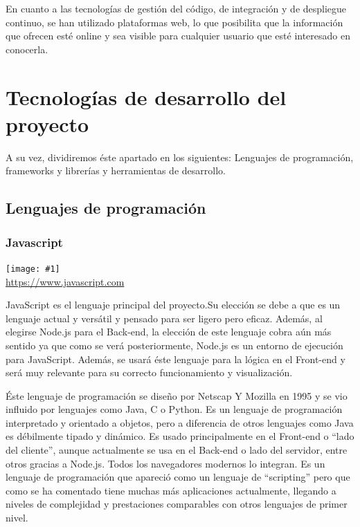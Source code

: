 \documentclass[11pt,openany]{book}
\newcommand{\logo}[2]{\medskip\begin{center}\texttt{[image: \#1]}\\\scriptsize\url{#2}\end{center}\bigskip}
\begin{document}
En cuanto a las tecnologías de gestión del código, de integración y de despliegue continuo, se han utilizado plataformas web, lo que posibilita que la información que ofrecen esté online y sea visible para cualquier usuario que esté interesado en conocerla. 

\section{Tecnologías de desarrollo del proyecto}

A su vez, dividiremos éste apartado en los siguientes: Lenguajes de programación, frameworks y librerías y herramientas de desarrollo.

\subsection{Lenguajes de programación}

\subsubsection{Javascript}

\logo{logos/javascript.jpg}{https://www.javascript.com}

JavaScript es el lenguaje principal del proyecto.Su elección se debe a que es un lenguaje actual y versátil y pensado para ser ligero pero eficaz. Además, al elegirse Node.js para el Back-end, la elección de este lenguaje cobra aún más sentido ya que como se verá posteriormente, Node.js es un entorno de ejecución para JavaScript. Además, se usará éste lenguaje para la lógica en el Front-end y será muy relevante para su correcto funcionamiento y visualización.

Éste lenguaje de programación se diseño por Netscap Y Mozilla en 1995 y se vio influido por lenguajes como Java, C o Python\cite{2}. Es un lenguaje de programación interpretado y orientado a objetos, pero a diferencia de otros lenguajes como Java es débilmente tipado y dinámico. Es usado principalmente en el Front-end o ``lado del cliente'', aunque actualmente se usa en el Back-end o lado del servidor, entre otros gracias a Node.js. Todos los navegadores modernos lo integran. Es un lenguaje de programación que apareció como un lenguaje de ``scripting'' pero que como se ha comentado tiene muchas más aplicaciones actualmente, llegando a niveles de complejidad y prestaciones comparables con otros lenguajes de primer nivel.
\end{document}
